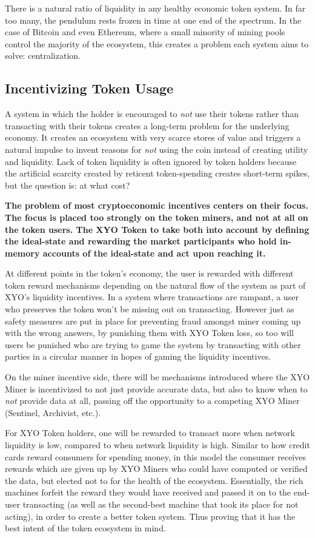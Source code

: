 \documentclass{article}
\begin{document}
There is a natural ratio of liquidity in any healthy economic token system. In far too many, the pendulum rests frozen in time at one end of the spectrum. In the case of Bitcoin and even Ethereum, where a small minority of mining pools control the majority of the ecosystem, this creates a problem each system aims to solve: centralization.

\subsection{Incentivizing Token Usage}

A system in which the holder is encouraged to \textit{not} use their tokens rather than transacting with their tokens creates a long-term problem for the underlying economy.  It creates an ecosystem with very scarce stores of value and triggers a natural impulse to invent reasons for \textit{not} using the coin instead of creating utility and liquidity. Lack of token liquidity is often ignored by token holders because the artificial scarcity created by reticent token-spending creates short-term spikes, but the question is: at what cost?

\textbf{The problem of most cryptoeconomic incentives centers on their focus. The focus is placed too strongly on the token miners, and not at all on the token users. The XYO Token to take both into account by defining the ideal-state and rewarding the market participants who hold in-memory accounts of the ideal-state and act upon reaching it.}

At different points in the token's economy, the user is rewarded with different token reward mechanisms depending on the natural flow of the system as part of XYO's liquidity incentives. In a system where transactions are rampant, a user who preserves the token won't be missing out on transacting. However just as safety measures are put in place for preventing fraud amongst miner coming up with the wrong answers, by punishing them with XYO Token loss, so too will users be punished who are trying to game the system by transacting with other parties in a circular manner in hopes of gaming the liquidity incentives.

On the miner incentive side, there will be mechanisms introduced where the XYO Miner is incentivized to not just provide accurate data, but also to know when to \textit{not} provide data at all, passing off the opportunity to a competing XYO Miner (Sentinel, Archivist, etc.). 

For XYO Token holders, one will be rewarded to transact more when network liquidity is low, compared to when network liquidity is high. Similar to how credit cards reward consumers for spending money, in this model the consumer receives rewards which are given up by XYO Miners who could have computed or verified the data, but elected not to for the health of the ecosystem. Essentially, the rich machines forfeit the reward they would have received and passed it on to the end-user transacting (as well as the second-best machine that took its place for not acting), in order to create a better token system. Thus proving that it has the best intent of the token ecosystem in mind.
\end{document}
